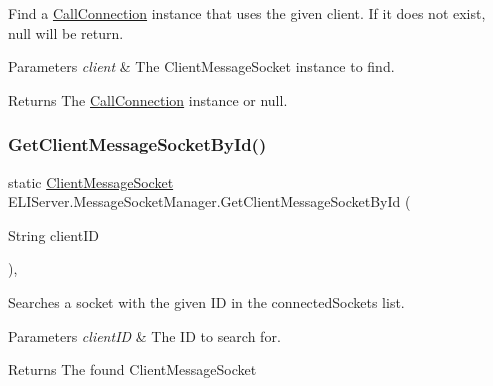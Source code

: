 Find a \hyperlink{class_e_l_i_server_1_1_call_connection}{Call\+Connection} instance that uses the given client. If it does not exist, null will be return. 


\begin{DoxyParams}{Parameters}
{\em client} & The Client\+Message\+Socket instance to find.\\
\hline
\end{DoxyParams}
\begin{DoxyReturn}{Returns}
The \hyperlink{class_e_l_i_server_1_1_call_connection}{Call\+Connection} instance or null.
\end{DoxyReturn}
\mbox{\label{class_e_l_i_server_1_1_message_socket_manager_aa93a10042f33c7fe76d611346eb80ea0}} 
\subsubsection{\texorpdfstring{Get\+Client\+Message\+Socket\+By\+Id()}{GetClientMessageSocketById()}}
{\footnotesize\ttfamily static \hyperlink{class_e_l_i_server_1_1_messaging_1_1_client_message_socket}{Client\+Message\+Socket} E\+L\+I\+Server.\+Message\+Socket\+Manager.\+Get\+Client\+Message\+Socket\+By\+Id (\begin{DoxyParamCaption}\item[{String}]{client\+ID }\end{DoxyParamCaption})\hspace{0.3cm}{\ttfamily [inline]}, {\ttfamily [static]}}



Searches a socket with the given ID in the connected\+Sockets list. 


\begin{DoxyParams}{Parameters}
{\em client\+ID} & The ID to search for.\\
\hline
\end{DoxyParams}
\begin{DoxyReturn}{Returns}
The found Client\+Message\+Socket
\end{DoxyReturn}
\mbox{\label{class_e_l_i_server_1_1_message_socket_manager_a6988d1ee0c08ded66a3d428f04585716}} 
